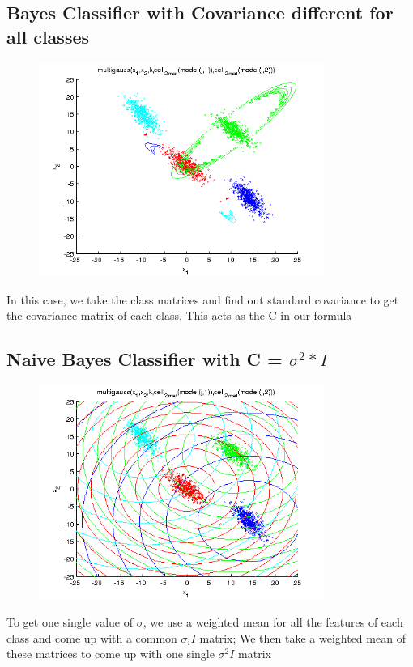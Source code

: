 \documentclass[11pt,a4paper]{article}
\begin{document}
 \subsection{Bayes Classifier with Covariance different for all classes}
 \begin{figure}[H]
		\centering
\includegraphics[height=7cm]{Figures/contour_2.png}
\end{figure}
In this case, we take the class matrices and find out standard covariance to get the covariance matrix of each class. This acts as the C in our formula
 \subsection{Naive Bayes Classifier with C = $\sigma^2*I$}
 \begin{figure}[H]
		\centering
\includegraphics[height=7cm]{Figures/contour_3.png}
\end{figure}
To get one single value of $\sigma$, we use a weighted mean for all the features of each class and come up with a common $\sigma_iI$ matrix; We then take a weighted mean of these matrices to come up with one single $\sigma^2I$ matrix
\end{document}
